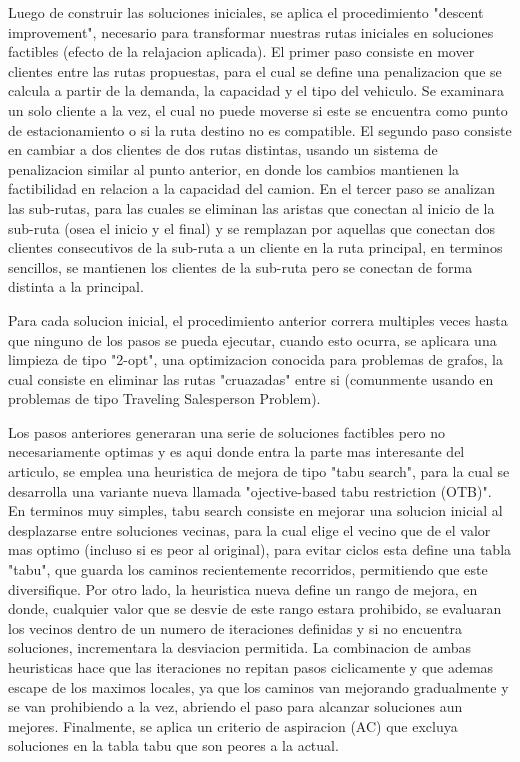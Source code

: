 \documentclass[letter, 10pt]{article}
\begin{document}
Luego de construir las soluciones iniciales, se aplica el procedimiento "descent improvement", necesario para transformar nuestras rutas
iniciales en soluciones factibles (efecto de la relajacion aplicada).
El primer paso consiste en mover clientes entre las rutas propuestas, para el cual se define una penalizacion que se calcula a partir de
la demanda, la capacidad y el tipo del vehiculo. Se examinara un solo cliente a la vez, el cual no puede moverse si este se encuentra como
punto de estacionamiento o si la ruta destino no es compatible.
El segundo paso consiste en cambiar a dos clientes de dos rutas distintas, usando un sistema de penalizacion similar al punto anterior, en
donde los cambios mantienen la factibilidad en relacion a la capacidad del camion.
En el tercer paso se analizan las sub-rutas, para las cuales se eliminan las aristas que conectan al inicio de la sub-ruta (osea el inicio y
el final) y se remplazan por aquellas que conectan dos clientes consecutivos de la sub-ruta a un cliente en la ruta principal, en terminos
sencillos, se mantienen los clientes de la sub-ruta pero se conectan de forma distinta a la principal.

Para cada solucion inicial, el procedimiento anterior correra multiples veces hasta que ninguno de los pasos se pueda ejecutar, cuando esto
ocurra, se aplicara una limpieza de tipo "2-opt", una optimizacion conocida para problemas de grafos, la cual consiste en eliminar las rutas
"cruazadas" entre si (comunmente usando en problemas de tipo Traveling Salesperson Problem).

Los pasos anteriores generaran una serie de soluciones factibles pero no necesariamente optimas y es aqui donde entra la parte mas interesante
del articulo, se emplea una heuristica de mejora de tipo "tabu search", para la cual se desarrolla una variante nueva llamada "ojective-based tabu
restriction (OTB)". En terminos muy simples, tabu search consiste en mejorar una solucion inicial al desplazarse entre soluciones vecinas, para la
cual elige el vecino que de el valor mas optimo (incluso si es peor al original), para evitar ciclos esta define una tabla "tabu", que guarda los
caminos recientemente recorridos, permitiendo que este diversifique. Por otro lado, la heuristica nueva define un rango de mejora, en donde, cualquier
valor que se desvie de este rango estara prohibido, se evaluaran los vecinos dentro de un numero de iteraciones definidas y si no encuentra soluciones,
incrementara la desviacion permitida. La combinacion de ambas heuristicas hace que las iteraciones no repitan pasos ciclicamente y que ademas escape
de los maximos locales, ya que los caminos van mejorando gradualmente y se van prohibiendo a la vez, abriendo el paso para alcanzar soluciones
aun mejores. Finalmente, se aplica un criterio de aspiracion (AC) que excluya soluciones en la tabla tabu que son peores a la actual.
\end{document}
